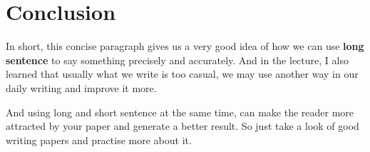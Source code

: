 \documentclass{article}
\begin{document}
\section{Conclusion}

In short, this concise paragraph gives us a very good idea of how we can use \textbf{long sentence} to say something precisely and accurately. And in the lecture, I also learned that usually what we write is too casual, we may use another way in our daily writing and improve it more.

And using long and short sentence at the same time, can make the reader more attracted by your paper and generate a better result. So just take a look of good writing papers and practise more about it.
\end{document}
